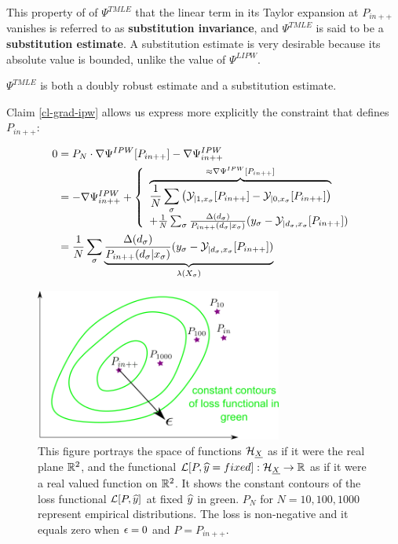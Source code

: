 This property of
of $\Psi^{TMLE}$
that the linear term
in its Taylor expansion at $P_{in++}$ vanishes
is referred to as {\bf substitution
invariance}, and $\Psi^{TMLE}$
is said to be a {\bf substitution estimate}.
A substitution estimate is
very desirable because
its
absolute value is bounded, unlike
the value of $\Psi^{LIPW}$.

$\Psi^{TMLE}$ is both
a doubly robust estimate and a substitution estimate.

Claim \ref{cl-grad-ipw} allows us
express
more explicitly the constraint that defines $P_{in++}$:

\begin{align}
0 &=
P_N\cdot\nabla\Psi^{IPW}[P_{in++}]-\nabla\Psi^{IPW}_{in++}
\\
&= -\nabla\Psi^{IPW}_{in++}+
\left\{
\begin{array}{l}
\overbrace{
\frac{1}{N}
\sum_\sigma
\left(
{\cal Y}_{|1,x_\sigma}[P_{in++}]
-
{\cal Y}_{|0,x_\sigma}[P_{in++}]
\right)
}^{ \approx \nabla\Psi^{IPW}[P_{in++}]}
\\
+
\frac{1}{N}
\sum_\sigma
\frac{\Delta(d_\sigma)}{P_{in++}(d_\sigma|x_\sigma)}
(y_\sigma-{\cal Y}_{|d_\sigma,x_\sigma}[P_{in++}])
\end{array}
\right.
\\
&=
\frac{1}{N}
\sum_\sigma \underbrace{
\frac{\Delta(d_\sigma)}{P_{in++}(d_\sigma|x_\sigma)}
(y_\sigma-{\cal Y}_{|d_\sigma,x_\sigma}[P_{in++}])
}_{\lambda(X_\sigma)}
\label{eq-loss-xi}
\end{align}


\begin{figure}[h!]
\centering
\includegraphics[width=3.2in]
{targeted-est/targeted-est.png}
\caption{
This figure portrays
the space of functions ${\cal H}_{\underline{X}}$
as if it were the real plane ${ \mathbb{R}}^2$,
and the functional ${\cal L}[P, {\widehat{y}}=fixed]:{\cal H}_{\underline{X}}
\rightarrow{ \mathbb{R}}$
as if it were a real valued function on ${ \mathbb{R}}^2$.
It shows  the constant contours
of the loss functional ${\cal L}[P, {\widehat{y}}]$
at fixed ${\widehat{y}}$ in green.
$P_N$ for $N=10, 100, 1000$
represent empirical distributions.
The loss is non-negative and it equals
zero when $\epsilon=0$ and $P=P_{in++}$.
}
\label{fig-targeted-est}
\end{figure}

